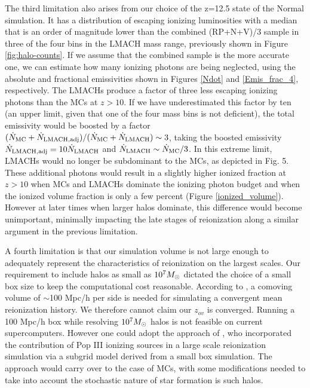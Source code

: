 \documentclass[iop,apj]{emulateapj}
\begin{document}
The third limitation also arises from our choice of the z=12.5 state of the Normal simulation. It has a distribution of escaping ionizing luminosities with a median that is an order of magnitude lower than the combined (RP+N+V)/3 sample in three of the four bins in the LMACH mass range, previously shown in Figure \ref{fig:halo-counts}.  If we assume that the combined sample is the more accurate one, we can estimate how many ionizing photons are being neglected, using the absolute and fractional emissivities shown in Figures \ref{Ndot} and \ref{Emis_frac_4}, respectively.  The LMACHs produce a factor of three less escaping ionizing photons than the MCs at $z > 10$.  If we have underestimated this factor by ten (an upper limit, given that one of the four mass bins is not deficient), the total emissivity would be boosted by a factor $(\dot{N}_{\rm MC} + \dot{N}_{\rm LMACH,adj}) / (\dot{N}_{\rm MC} + \dot{N}_{\rm LMACH}) \sim 3$, taking the boosted emissivity $\dot{N}_{\rm LMACH,adj} = 10\dot{N}_{\rm LMACH}$ and $\dot{N}_{\rm LMACH} \sim \dot{N}_{\rm MC}/3$.  In this extreme limit, LMACHs would no longer be subdominant to the MCs, as depicted in Fig. 5. These additional photons would result in a slightly higher ionized fraction at $z > 10$ when MCs and LMACHs dominate the ionizing photon budget and when the ionized volume fraction is only a few percent (Figure \ref{ionized_volume}).  However at later times when larger halos dominate, this difference would become unimportant, minimally impacting the late stages of reionization along a similar argument in the previous limitation.


A fourth limitation is that our simulation volume is not large enough to adequately represent the characteristics of reionization on the largest scales. Our requirement to include halos as small as $10^7\Ms$ dictated the choice of a small box size to keep the computational cost reasonable.  According to \cite{Iliev14}, a comoving volume of $\sim$100 Mpc/h per side is needed for simulating a convergent mean reionization history. We therefore cannot claim our $z_{ov}$ is converged. Running a 100 Mpc/h box while resolving $10^7\Ms$ halos is not feasible on current supercomputers. However one could adopt the approach of \cite{Ahn12}, who incorporated the contribution of Pop III ionizing sources in a large scale reionization simulation via a subgrid model derived from a small box simulation. The approach would carry over to the case of MCs, with some modifications needed to take into account the stochastic nature of star formation is such halos. 
\end{document}
